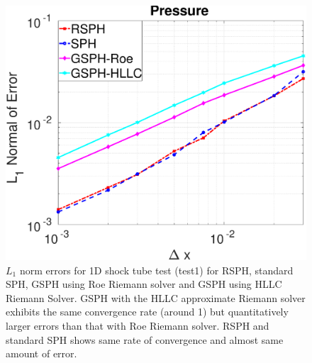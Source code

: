 \begin{figure}
    \begin{minipage}{.332\textwidth}
        \centering
        \includegraphics[width=0.99 \textwidth]{./Chapter-4/Figures/Accuracy-pre}
    \end{minipage}%
    \caption{ $L_1$ norm errors for 1D shock tube test (test1) for RSPH, standard SPH, GSPH using Roe Riemann solver and GSPH using HLLC Riemann Solver.  GSPH with the HLLC approximate Riemann solver exhibits the same convergence rate (around 1) but quantitatively larger errors than that with Roe Riemann solver. RSPH and standard SPH shows same rate of convergence and almost same amount of error.}
    \label{fig:Accuracy-test1}
\end{figure}
 
